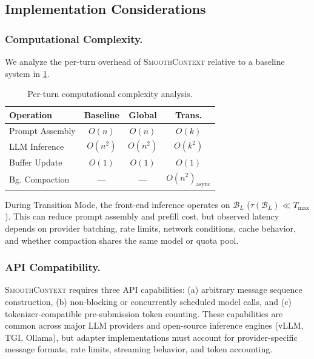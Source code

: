 \documentclass[10pt,twocolumn]{article}
\newcommand{\sys}{\textsc{SmoothContext}}
\newcommand{\bufL}{\mathcal{B}_L}
\newcommand{\Dtok}{\tau}
\newcommand{\Tmax}{T_{\max}}
\begin{document}
\subsection{Implementation Considerations}\label{sec:impl}

\subsubsection{Computational Complexity.}

We analyze the per-turn overhead of \sys{} relative to a baseline system in \cref{tab:complexity}.

\begin{table}[h]
\centering
\caption{Per-turn computational complexity analysis.}
\label{tab:complexity}
\small
\begin{tabular}{@{}lccc@{}}
\toprule
\textbf{Operation} & \textbf{Baseline} & \textbf{Global} & \textbf{Trans.} \\
\midrule
Prompt Assembly   & $O(n)$     & $O(n)$     & $O(k)$ \\
LLM Inference     & $O(n^2)$   & $O(n^2)$   & $O(k^2)$ \\
Buffer Update     & $O(1)$     & $O(1)$     & $O(1)$ \\
Bg. Compaction    & ---        & ---        & $O(n^2)_{\text{async}}$ \\
\bottomrule
\end{tabular}
\end{table}

During Transition Mode, the front-end inference operates on $\bufL$ ($\Dtok(\bufL) \ll \Tmax$). This can reduce prompt assembly and prefill cost, but observed latency depends on provider batching, rate limits, network conditions, cache behavior, and whether compaction shares the same model or quota pool.

\subsubsection{API Compatibility.}

\sys{} requires three API capabilities: (a) arbitrary message sequence construction, (b) non-blocking or concurrently scheduled model calls, and (c) tokenizer-compatible pre-submission token counting. These capabilities are common across major LLM providers and open-source inference engines (vLLM, TGI, Ollama), but adapter implementations must account for provider-specific message formats, rate limits, streaming behavior, and token accounting.
\end{document}
